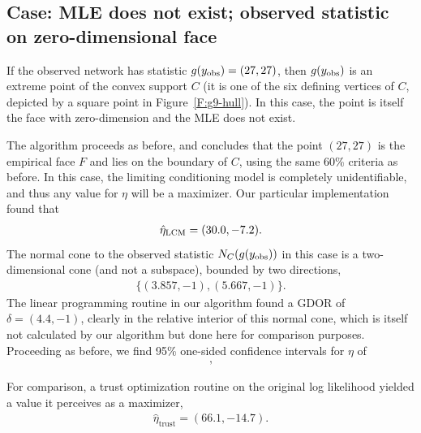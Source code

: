 \subsection{Case: MLE does not exist; observed statistic on zero-dimensional face}
If the observed network has statistic $g(y_{\text{obs}}) = (27, 27)$,  then 
$g(y_{\text{obs}})$ is an extreme point
of the convex support $C$ (it is one of the six defining vertices of $C$, depicted by
a square point in Figure~\ref{F:g9-hull}).  In this case, the point is itself the 
face with zero-dimension and the MLE does not exist.  

The algorithm proceeds as before, and concludes that the 
point $(27,27)$ is the empirical face $F$ and lies on the boundary of $C$, using the
same 60\% criteria as before.
In this case, the limiting conditioning model is completely unidentifiable, and thus 
any value for $\eta$ will be a maximizer.  Our particular implementation found that
\begin{align*}
	\hat{\eta}_{\textrm{LCM}} = (30.0, -7.2 ).
\end{align*}
The normal cone to the observed statistic $N_C (g(y_{\text{obs}}) )$ in this case is a two-dimensional cone (and not a subspace), bounded by 
two directions,
\begin{align*}
	 \{ (3.857,   -1),	(5.667,   -1) \}.
\end{align*}
The linear programming routine in our algorithm found a GDOR of 
$\delta = (4.4, -1)$, clearly 
in the relative interior of this normal cone, which is itself not calculated by
our algorithm but done here for comparison purposes.
Proceeding as before, we find 95\% one-sided confidence intervals for $\eta$ of 
\begin{align*}
	[14.32, +\infty)\\
	(-\infty, -3.65],
\end{align*}


For comparison, a trust optimization routine on the original log 
likelihood yielded a value it perceives as a maximizer,  
\begin{align*}
 	\hat{\eta}_{\textrm{trust}} = (66.1, -14.7).
 \end{align*}

